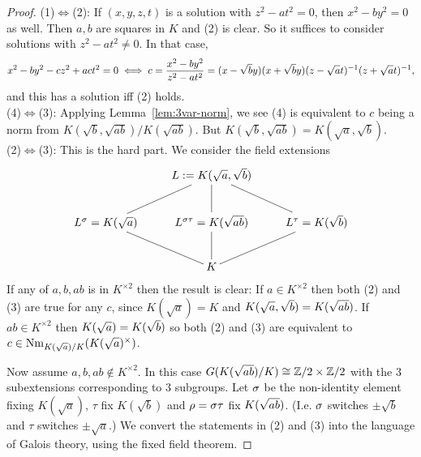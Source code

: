 \begin{proof}
(1)$\iff$(2): If $(x,y,z,t)$ is a solution with $z^2-at^2=0$, then $x^2-by^2=0$ as well. Then $a,b$ are squares in $K$ and (2) is clear. 
So it suffices to consider solutions with $z^2-at^2\ne 0$. In that case,
\[
x^2-by^2-cz^2+act^2=0
\iff
c=\frac{x^2-by^2}{z^2-at^2}=(x-\sqrt b y)(x+\sqrt b y)(z-\sqrt a t)^{-1}(z+\sqrt at)^{-1},
\]
and this has a solution iff (2) holds.\\

(4)$\iff$(3): Applying Lemma~\ref{lem:3var-norm}, we see (4) is equivalent to $c$ being a norm from $K(\sqrt{b},\sqrt{ab})/K(\sqrt{ab})$. But $K(\sqrt{b},\sqrt{ab})=K(\sqrt{a},\sqrt{b})$.\\

(2)$\iff$(3): This is the hard part. We consider the field extensions
\[
\xymatrix{
&L:=K(\sqrt a,\sqrt b)\ar@{-}[ld]\ar@{-}[d]\ar@{-}[rd]&\\
L^{\si}=K(\sqrt a)\ar@{-}[rd] & L^{\si\tau}=K(\sqrt{ab}) \ar@{-}[d] & L^{\tau}=\ks b\ar@{-}[ld]\\
& K &
}
\]
If any of $a,b,ab$ is in $K^{\times2}$ then the result is clear: If $a\in K^{\times 2}$ then both (2) and (3) are true for any $c$, since $K(\sqrt{a})=K$ and $K(\sqrt{a},\sqrt b)=K(\sqrt{ab})$. If $ab\in K^{\times 2}$ then $K(\sqrt{a})=K(\sqrt{b})$ so both (2) and (3) are equivalent to $c\in \operatorname{Nm}_{K(\sqrt a)/K}(K(\sqrt{a})^{\times})$. 

Now assume $a,b,ab\nin K^{\times2}$. In this case $G(K(\sqrt{ab})/K)\cong \mathbb{Z}/2\times \mathbb{Z}/2$ with the 3 subextensions corresponding to 3 subgroups. Let $\sigma$ be the non-identity element fixing $K(\sqrt a)$, $\tau$ fix $K(\sqrt b)$ and $\rho=\sigma\tau$ fix $K(\sqrt{ab})$. (I.e. $\sigma$ switches $\pm \sqrt b$ and $\tau$ switches $\pm\sqrt a$.) We convert the statements in (2) and (3) into the language of Galois theory, using the fixed field theorem.


\end{proof}
